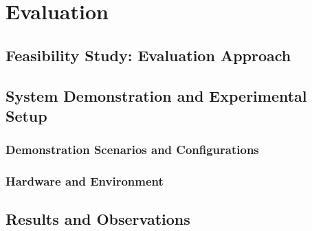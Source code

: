 \documentclass[openany]{book}
\begin{document}


\chapter{Evaluation}
\section{Feasibility Study: Evaluation Approach}
\section{System Demonstration and Experimental Setup}
    \subsection{Demonstration Scenarios and Configurations}
    \subsection{Hardware and Environment}
\section{Results and Observations}
\end{document}
